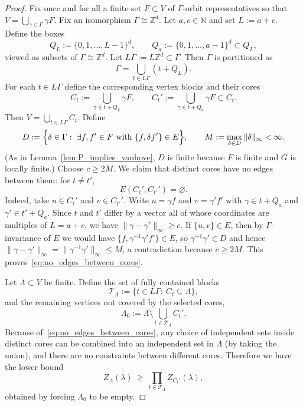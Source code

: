 \documentclass[a4paper,11pt]{article}
\theoremstyle{plain}
\theoremstyle{definition}
\theoremstyle{remark}
\newcommand{\1}{\mathbf{1}}
\begin{document}
\begin{proof}
Fix once and for all a finite set $F\subset V$ of $\Gamma$-orbit representatives so that
$V=\bigcup_{\gamma\in\Gamma}\gamma F$.
Fix an isomorphism $\Gamma\cong \mathbb{Z}^d$. Let $a,c\in\mathbb{N}$ and set $L:=a+c$. Define the boxes
\[
Q_L:=\{0,1,\dots,L-1\}^d,\qquad Q_a:=\{0,1,\dots,a-1\}^d\subset Q_L,
\]
viewed as subsets of $\Gamma\cong\mathbb{Z}^d$. Let $L\Gamma:=L\mathbb{Z}^d\subset \Gamma$.
Then $\Gamma$ is partitioned as
\[
\Gamma=\bigcup_{t\in L\Gamma}(t+Q_L).
\]
For each $t\in L\Gamma$ define the corresponding vertex blocks and their cores
\[
C_t:=\bigcup_{\gamma\in t+Q_L}\gamma F,\qquad
C_t':=\bigcup_{\gamma\in t+Q_a}\gamma F\subset C_t.
\]
Then $V=\bigcup_{t\in L\Gamma}C_t$. Define
\[
D:=\Bigl\{\delta\in\Gamma:\ \exists f,f'\in F \text{ with } \{f,\delta f'\}\in E\Bigr\},
\qquad
M:=\max_{\delta\in D}\|\delta\|_\infty<\infty.
\]
(As in Lemma~\ref{lem:P_implies_vanhove}, $D$ is finite because $F$ is finite and $G$ is locally finite.)
Choose $c\ge 2M$. We claim that distinct cores have no edges between them:
for $t\neq t'$,
\begin{equation}\label{eq:no_edges_between_cores}
E(C_t',C_{t'}')=\varnothing.
\end{equation}
Indeed, take $u\in C_t'$ and $v\in C_{t'}'$. Write $u=\gamma f$ and $v=\gamma'f'$ with
$\gamma\in t+Q_a$ and $\gamma'\in t'+Q_a$. Since $t$ and $t'$ differ by a vector all of whose
coordinates are multiples of $L=a+c$, we have $\|\gamma-\gamma'\|_\infty\ge c$.
If $\{u,v\}\in E$, then by $\Gamma$-invariance of $E$ we would have
$\{f,\gamma^{-1}\gamma' f'\}\in E$, so $\gamma^{-1}\gamma'\in D$ and hence
$\|\gamma-\gamma'\|_\infty=\|\gamma^{-1}\gamma'\|_\infty\le M$, a contradiction because $c\ge 2M$.
This proves~\eqref{eq:no_edges_between_cores}.

Let $\Lambda\subset V$ be finite. Define the set of fully contained blocks
\[
\mathcal{T}_\Lambda:=\{t\in L\Gamma:\ C_t\subseteq \Lambda\},
\]
and the remaining vertices not covered by the selected cores,
\[
\Lambda_0:=\Lambda\setminus \bigcup_{t\in\mathcal{T}_\Lambda} C_t'.
\]
Because of~\eqref{eq:no_edges_between_cores}, any choice of independent sets inside distinct
cores can be combined into an independent set in $\Lambda$ (by taking the union), and there are
no constraints between different cores. Therefore we have the lower bound
\begin{equation}\label{eq:lower_bound_partition}
Z_\Lambda(\lambda)\ \ge\ \prod_{t\in\mathcal{T}_\Lambda} Z_{C_t'}(\lambda),
\end{equation}
obtained by forcing $\Lambda_0$ to be empty.


\end{proof}
\end{document}
